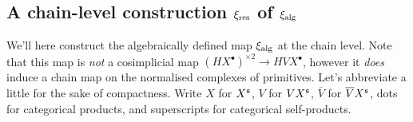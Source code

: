 \documentclass[10pt]{article}
\begin{document}
\begin{Adams Muliplicativity}
\subsection{A chain-level construction $\xi_\textup{res}$ of $\xi_\textup{alg}$}
We'll here construct the algebraically defined map $\xi_\textup{alg}$ at the chain level. Note that this map is \emph{not} a cosimplicial map $(HX^\bullet)^{\times2}\to HVX^\bullet$, however it \emph{does} induce a chain map on the normalised complexes of primitives.
Let's abbreviate a little for the sake of compactness. Write $X$ for $X^{\mathfrak{s}}$, $V$ for $VX^{\mathfrak{s}}$, $\overline{V}$ for $\overline{V}X^{\mathfrak{s}}$, dots for categorical products, and superscripts for categorical self-products.

\end{Adams Muliplicativity}
\end{document}
